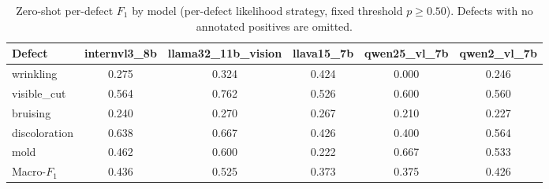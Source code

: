 \begin{table}[!htbp]
\centering
\caption{Zero-shot per-defect $F_1$ by model (per-defect likelihood strategy, fixed threshold $p \geq 0.50$). Defects with no annotated positives are omitted.}
\label{tab:defects_f1_logit_per_defect}
\begin{tabular}{@{}lccccc@{}}
\toprule
\textbf{Defect} & \textbf{internvl3\_8b} & \textbf{llama32\_11b\_vision} & \textbf{llava15\_7b} & \textbf{qwen25\_vl\_7b} & \textbf{qwen2\_vl\_7b} \\
\midrule
wrinkling & 0.275 & 0.324 & 0.424 & 0.000 & 0.246 \\
visible\_cut & 0.564 & 0.762 & 0.526 & 0.600 & 0.560 \\
bruising & 0.240 & 0.270 & 0.267 & 0.210 & 0.227 \\
discoloration & 0.638 & 0.667 & 0.426 & 0.400 & 0.564 \\
mold & 0.462 & 0.600 & 0.222 & 0.667 & 0.533 \\
\midrule
Macro-$F_1$ & 0.436 & 0.525 & 0.373 & 0.375 & 0.426 \\
\bottomrule
\end{tabular}
\end{table}